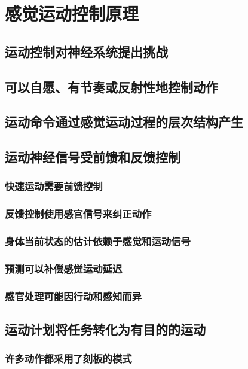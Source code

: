 \chapter{感觉运动控制原理}

\section{运动控制对神经系统提出挑战}

\section{可以自愿、有节奏或反射性地控制动作}

\section{运动命令通过感觉运动过程的层次结构产生}

\section{运动神经信号受前馈和反馈控制}
\subsection{快速运动需要前馈控制}
\subsection{反馈控制使用感官信号来纠正动作}
\subsection{身体当前状态的估计依赖于感觉和运动信号}
\subsection{预测可以补偿感觉运动延迟}
\subsection{感官处理可能因行动和感知而异}

\section{运动计划将任务转化为有目的的运动}
\subsection{许多动作都采用了刻板的模式}
